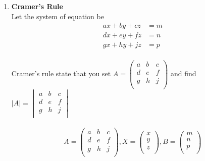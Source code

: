\documentclass[11pt,a4paper]{article}
\begin{document}
\begin{enumerate}
$$\therefore \hspace{0.5cm} x=1,\hspace{0.3cm} y=2,\hspace{0.3cm} z=-1$$\\





\item[(b).]\textbf{Cramer's Rule}\\
Let the system of equation be
\begin{align*}
ax+by+cz &=m\\
dx+ey+fz &=n\\
gx+hy+jz &=p\\
\end{align*}

Cramer's rule state that you set $A=
\begin{pmatrix}
a & b & c\\
d & e & f\\
g & h & j\\
\end{pmatrix}
$ and find $|A|=
\begin{vmatrix}
a & b & c\\
d & e & f\\
g & h & j\\
\end{vmatrix}
$\\\\

$$A=
\begin{pmatrix}
a & b & c\\
d & e & f\\
g & h & j\\
\end{pmatrix}
, X=
\begin{pmatrix}
x\\y\\z\\
\end{pmatrix}
, B=
\begin{pmatrix}
m\\ n\\ p\\
\end{pmatrix}
$$\\


\end{enumerate}
\end{document}
